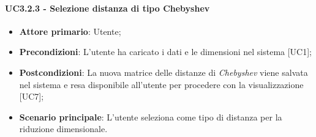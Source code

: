 \paragraph{UC3.2.3 - Selezione distanza di tipo Chebyshev}
\begin{itemize}
	\item \textbf{Attore primario}: Utente;
	\item \textbf{Precondizioni}: L'utente ha caricato i dati e le dimensioni nel sistema [UC1];
	\item \textbf{Postcondizioni}: La nuova matrice delle distanze di \textit{Chebyshev} viene salvata nel sistema e resa disponibile all'utente per procedere con la visualizzazione [UC7];
	\item \textbf{Scenario principale}: L'utente seleziona  come tipo di distanza per la riduzione dimensionale.
\end{itemize}